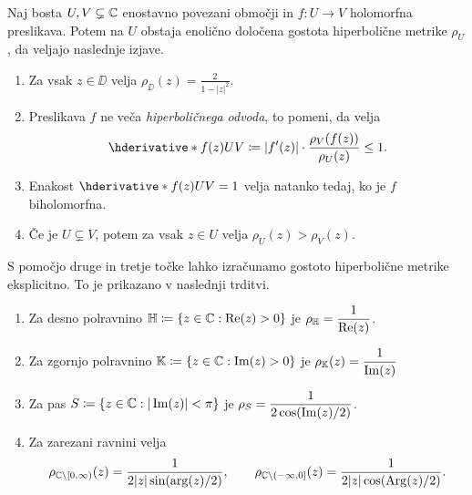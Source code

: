 \begin{izrek}[Pick] \label{thm:pick}
    Naj bosta \(U, V \subsetneq \mathbb C\) enostavno povezani območji in \(f \colon U \to V\) holomorfna preslikava. Potem na \(U\) obstaja enolično določena gostota hiperbolične metrike \(\rho_U\), da veljajo naslednje izjave.
    \begin{enumerate}
        \item Za vsak \(z \in \DD\) velja \(\rho_{\DD} (z) = \frac{2}{1 - |z|^2}\).
        \item Preslikava \(f\) ne veča \emph{hiperboličnega odvoda}, to pomeni, da velja \[\hder{f (z)}{U}{V} \coloneq |f' (z)| \cdot \frac{\rho_V (f (z))}{\rho_U (z)} \leq 1.\]
        \item Enakost \(\hder{f (z)}{U}{V} = 1\) velja natanko tedaj, ko je \(f\) biholomorfna.
        \item Če je \(U \subsetneq V\), potem za vsak \(z \in U\) velja \(\rho_U (z) > \rho_V (z)\).
    \end{enumerate}
\end{izrek}

\noindent S pomočjo druge in tretje točke lahko izračunamo gostoto hiperbolične metrike eksplicitno. To je prikazano v naslednji trditvi.

\begin{trditev} \label{prop:hypexamples} \mbox{}
    \begin{enumerate}
        \item Za desno polravnino \(\mathbb H \coloneq \left\{  z \in \mathbb C : \operatorname{Re} (z) > 0  \right\}\) je \(\displaystyle \rho_\mathbb H = \frac{1}{\operatorname{Re} (z)}\).
        \item Za zgornjo polravnino \(\mathbb K \coloneq \left\{ z \in \mathbb C : \operatorname{Im} (z) > 0 \right\}\) je \(\displaystyle \rho_{\mathbb K} (z) = \frac{1}{\operatorname{Im} (z)}\)
        \item Za pas \(S \coloneq \left\{ z \in \mathbb C : |\operatorname{Im} (z)| < \pi \right\}\) je \(\displaystyle \rho_{S} = \frac{1}{2 \cos (\operatorname{Im} (z) / 2)}\).
        \item Za zarezani ravnini velja
              \[
                  \rho_{\mathbb C \setminus [0, \infty)} (z) = \frac{1}{2 |z| \sin (\arg (z) / 2)},
                  \qquad
                  \rho_{\mathbb C \setminus (-\infty, 0]} (z) = \frac{1}{2 |z| \cos (\operatorname{Arg} (z) / 2)}.
              \]
    \end{enumerate}
\end{trditev}

